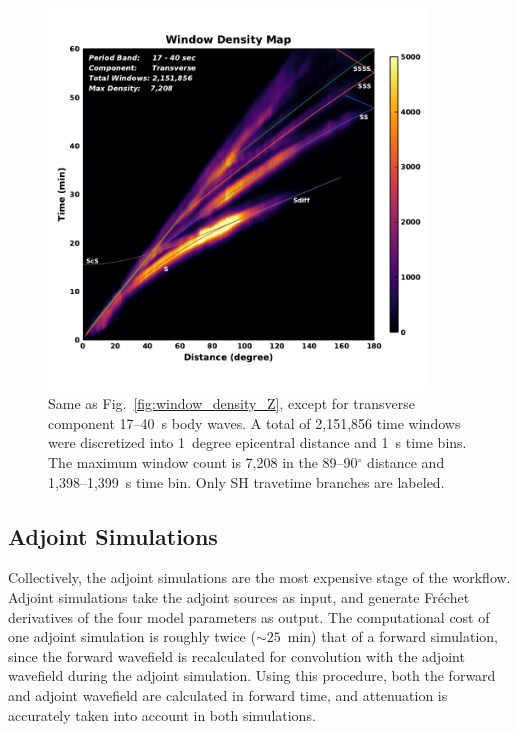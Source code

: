 \begin{figure}
  \centering
  \includegraphics[width=0.9\textwidth]{ch-GLADM25/figures/window_colorbar_linear_T.pdf}
  \caption[Time-distance plot for transverse component 17--40~s body waves]
  {\small{Same as Fig.~\ref{fig:window_density_Z}, except for transverse component 17--40~s body waves.
   A total of 2,151,856 time windows were discretized into 1~degree epicentral distance and 1~s time bins.
   The maximum window count is 7,208 in the 89--90$^\circ$ distance and 1,398--1,399~s time bin.
   Only SH travetime branches are labeled.}}
  \label{fig:window_density_T}
\end{figure}

\subsection{Adjoint Simulations}

Collectively,
the adjoint simulations are the most expensive stage of the workflow. 
Adjoint simulations take the adjoint sources as input, and generate Fr\'echet
derivatives of the four model parameters as output.
The computational cost of one adjoint simulation is roughly twice ($\sim25$~min) that of
a forward simulation, since the forward wavefield is recalculated for convolution with
the adjoint wavefield during the adjoint simulation.
Using this procedure,
both the forward and adjoint wavefield are calculated in forward time,
and attenuation is accurately taken into account in both simulations.

